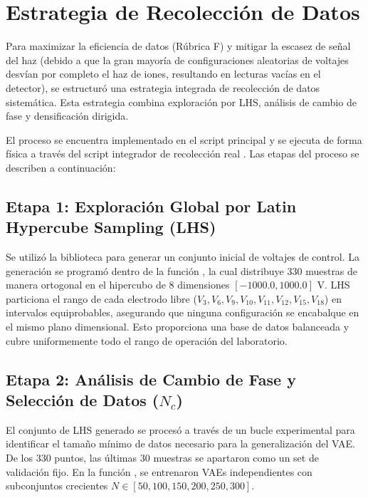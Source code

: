 \documentclass[12pt,letterpaper]{article}
\begin{document}
\newpage
\section{Estrategia de Recolección de Datos}
Para maximizar la eficiencia de datos (Rúbrica F) y mitigar la escasez de señal del haz (debido a que la gran mayoría de configuraciones aleatorias de voltajes desvían por completo el haz de iones, resultando en lecturas vacías en el detector), se estructuró una estrategia integrada de recolección de datos sistemática. Esta estrategia combina exploración por LHS, análisis de cambio de fase y densificación dirigida.

El proceso se encuentra implementado en el script principal  y se ejecuta de forma física a través del script integrador de recolección real . Las etapas del proceso se describen a continuación:

\subsection{Etapa 1: Exploración Global por Latin Hypercube Sampling (LHS)}
Se utilizó la biblioteca  para generar un conjunto inicial de voltajes de control. La generación se programó dentro de la función , la cual distribuye $330$ muestras de manera ortogonal en el hipercubo de 8 dimensiones $[-1000.0, 1000.0]\text{ V}$. LHS particiona el rango de cada electrodo libre ($V_3, V_6, V_9, V_{10}, V_{11}, V_{12}, V_{15}, V_{18}$) en intervalos equiprobables, asegurando que ninguna configuración se encabalque en el mismo plano dimensional. Esto proporciona una base de datos balanceada y cubre uniformemente todo el rango de operación del laboratorio.

\subsection{Etapa 2: Análisis de Cambio de Fase y Selección de Datos ($N_c$)}
El conjunto de LHS generado se procesó a través de un bucle experimental para identificar el tamaño mínimo de datos necesario para la generalización del VAE. De los 330 puntos, las últimas $30$ muestras se apartaron como un set de validación fijo. En la función , se entrenaron VAEs independientes con subconjuntos crecientes $N \in [50, 100, 150, 200, 250, 300]$. 
\end{document}
